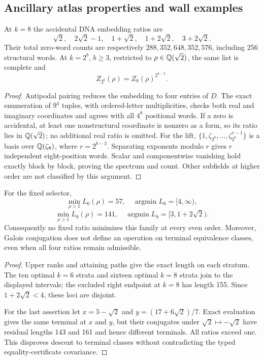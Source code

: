 \subsection{Ancillary atlas properties and wall examples}
\begin{proposition}
\label{prop:quadratic-embedding}
At $k=8$ the accidental DNA embedding ratios are
\[
 \sqrt2,\quad 2\sqrt2-1,\quad1+\sqrt2,\quad
 1+2\sqrt2,\quad3+2\sqrt2.
\]
Their total zero-word counts are respectively $288,352,648,352,576$,
including 256 structural words. At $k=2^b$, $b\ge3$, restricted
to $\rho\in\mathbb Q(\sqrt2)$, the same list is complete and
\[
 Z_{2^b}(\rho)=Z_8(\rho)^{2^{b-3}}.
\]
\end{proposition}
\begin{proof}
Antipodal pairing reduces the embedding to four entries of $D$.
The exact enumeration of $9^4$ tuples, with ordered-letter
multiplicities, checks both real and imaginary coordinates and
agrees with all $4^8$ positional words. If a zero is accidental,
at least one nonstructural coordinate is nonzero as a form, so
its ratio lies in $\mathbb Q(\sqrt2)$; no additional real ratio is omitted.
For the lift, $\{1,\zeta_{2^b},\ldots,\zeta_{2^b}^{r-1}\}$ is a
basis over $\mathbb Q(\zeta_8)$, where $r=2^{b-3}$. Separating exponents
modulo $r$ gives $r$ independent eight-position words. Scalar
and componentwise vanishing hold exactly block by block, proving
the spectrum and count. Other subfields at higher order are not
classified by this argument.
\end{proof}

\begin{proposition}
\label{prop:family-optima}
For the fixed selector,
\[
 \min_{\rho>1}L_6(\rho)=57,\quad
 \operatorname*{argmin}L_6=[4,\infty),
\]
\[
 \min_{\rho>1}L_8(\rho)=141,\quad
 \operatorname*{argmin}L_8=[3,1+2\sqrt2).
\]
Consequently no fixed ratio minimizes this family at every even order.
Moreover, Galois conjugation does not define an operation on terminal
equivalence classes, even when all four ratios remain admissible.
\end{proposition}
\begin{proof}
Upper ranks and attaining paths give the exact length on each
stratum. The ten optimal $k=6$ strata and sixteen optimal $k=8$
strata join to the displayed intervals; the excluded right endpoint
at $k=8$ has length 155. Since $1+2\sqrt2<4$, these loci are disjoint.

For the last assertion let
$x=5-\sqrt2$ and $y=(17+6\sqrt2)/7$.
Exact evaluation gives the same terminal at $x$ and $y$, but
their conjugates under $\sqrt2\mapsto-\sqrt2$ have residual lengths
143 and 161 and hence different terminals. All ratios exceed one.
This disproves descent to terminal classes without contradicting
the typed equality-certificate covariance.
\end{proof}

